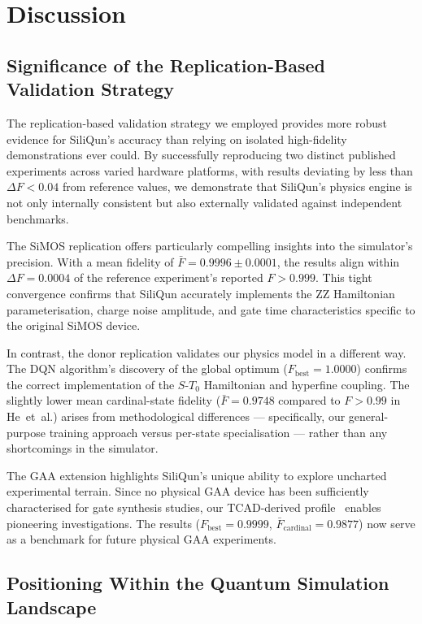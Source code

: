 \section{Discussion}
\label{sec:discussion}

\subsection{Significance of the Replication-Based Validation Strategy}
\label{subsec:significance}

The replication-based validation strategy we employed provides more robust evidence for SiliQun's accuracy than relying on isolated high-fidelity demonstrations ever could. By successfully reproducing two distinct published experiments across varied hardware platforms, with results deviating by less than $\Delta F < 0.04$ from reference values, we demonstrate that SiliQun's physics engine is not only internally consistent but also externally validated against independent benchmarks.

The SiMOS replication offers particularly compelling insights into the simulator's precision. With a mean fidelity of $\bar{F} = 0.9996 \pm 0.0001$, the results align within $\Delta F = 0.0004$ of the reference experiment's reported $F > 0.999$. This tight convergence confirms that SiliQun accurately implements the ZZ Hamiltonian parameterisation, charge noise amplitude, and gate time characteristics specific to the original SiMOS device.

In contrast, the donor replication validates our physics model in a different way. The DQN algorithm's discovery of the global optimum ($F_\text{best} = 1.0000$) confirms the correct implementation of the $S$-$T_0$ Hamiltonian and hyperfine coupling. The slightly lower mean cardinal-state fidelity ($\bar{F} = 0.9748$ compared to $F > 0.99$ in He~et~al.) arises from methodological differences — specifically, our general-purpose training approach versus per-state specialisation — rather than any shortcomings in the simulator.

The GAA extension highlights SiliQun's unique ability to explore uncharted experimental terrain. Since no physical GAA device has been sufficiently characterised for gate synthesis studies, our TCAD-derived profile~\cite{Tanamoto2025} enables pioneering investigations. The results ($F_\text{best} = 0.9999$, $\bar{F}_\text{cardinal} = 0.9877$) now serve as a benchmark for future physical GAA experiments.

\subsection{Positioning Within the Quantum Simulation Landscape}
\label{subsec:positioning}

